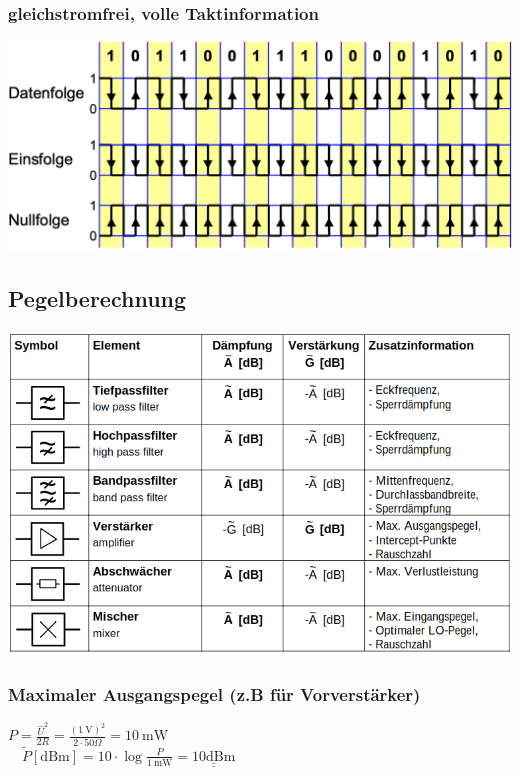 \subsubsection{gleichstromfrei, volle Taktinformation}
\begin{center}
    \includegraphics[width=\linewidth]{graphic/signalparameter/gleichstromfrei.png}
\end{center}
\vspace{-8pt}

\subsection{Pegelberechnung}
 \begin{center}
     \includegraphics[width=\linewidth]{graphic/signalparameter/pegelplan.png}
 \end{center}
 \vspace{-8pt}

\subsubsection{Maximaler Ausgangspegel (z.B für Vorverstärker)}
$P=\frac{\hat{U}^{2}}{2 R}=\frac{(1 \mathrm{~V})^{2}}{2 \cdot 50 \Omega}=10 \mathrm{~mW} $\\
$\quad \widetilde{P}[\mathrm{dBm}]=10 \cdot \log \frac{P}{1 \mathrm{~mW}}=\underline{\underline{10 \mathrm{dBm}}}$


